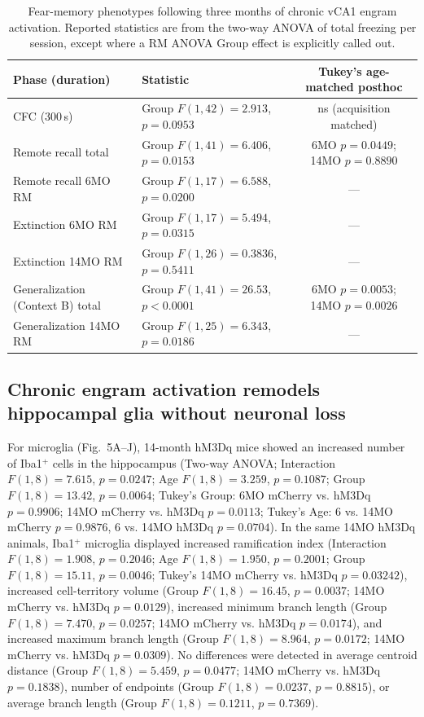 \documentclass[11pt]{article}
\begin{document}
\begin{table}[h]
\centering
\caption{Fear-memory phenotypes following three months of chronic vCA1 engram activation. Reported statistics are from the two-way ANOVA of total freezing per session, except where a RM ANOVA Group effect is explicitly called out.}
\label{tab:fear}
\begin{tabular}{llc}
\toprule
Phase (duration) & Statistic & Tukey's age-matched posthoc \\
\midrule
CFC (300\,s)          & Group $F(1,42)=2.913$, $p=0.0953$ & ns (acquisition matched) \\
Remote recall total  & Group $F(1,41)=6.406$, $p=0.0153$ & 6MO $p=0.0449$; 14MO $p=0.8890$ \\
Remote recall 6MO RM & Group $F(1,17)=6.588$, $p=0.0200$ & --- \\
Extinction 6MO RM    & Group $F(1,17)=5.494$, $p=0.0315$ & --- \\
Extinction 14MO RM   & Group $F(1,26)=0.3836$, $p=0.5411$ & --- \\
Generalization (Context B) total & Group $F(1,41)=26.53$, $p<0.0001$ & 6MO $p=0.0053$; 14MO $p=0.0026$ \\
Generalization 14MO RM & Group $F(1,25)=6.343$, $p=0.0186$ & --- \\
\bottomrule
\end{tabular}
\end{table}

\subsection{Chronic engram activation remodels hippocampal glia without neuronal loss}
For microglia (Fig.~5A--J), 14-month hM3Dq mice showed an increased number of Iba1$^{+}$ cells in the hippocampus (Two-way ANOVA; Interaction $F(1,8)=7.615$, $p=0.0247$; Age $F(1,8)=3.259$, $p=0.1087$; Group $F(1,8)=13.42$, $p=0.0064$; Tukey's Group: 6MO mCherry vs. hM3Dq $p=0.9906$; 14MO mCherry vs. hM3Dq $p=0.0113$; Tukey's Age: 6 vs. 14MO mCherry $p=0.9876$, 6 vs. 14MO hM3Dq $p=0.0704$). In the same 14MO hM3Dq animals, Iba1$^{+}$ microglia displayed increased ramification index (Interaction $F(1,8)=1.908$, $p=0.2046$; Age $F(1,8)=1.950$, $p=0.2001$; Group $F(1,8)=15.11$, $p=0.0046$; Tukey's 14MO mCherry vs. hM3Dq $p=0.03242$), increased cell-territory volume (Group $F(1,8)=16.45$, $p=0.0037$; 14MO mCherry vs. hM3Dq $p=0.0129$), increased minimum branch length (Group $F(1,8)=7.470$, $p=0.0257$; 14MO mCherry vs. hM3Dq $p=0.0174$), and increased maximum branch length (Group $F(1,8)=8.964$, $p=0.0172$; 14MO mCherry vs. hM3Dq $p=0.0309$). No differences were detected in average centroid distance (Group $F(1,8)=5.459$, $p=0.0477$; 14MO mCherry vs. hM3Dq $p=0.1838$), number of endpoints (Group $F(1,8)=0.0237$, $p=0.8815$), or average branch length (Group $F(1,8)=0.1211$, $p=0.7369$).
\end{document}
